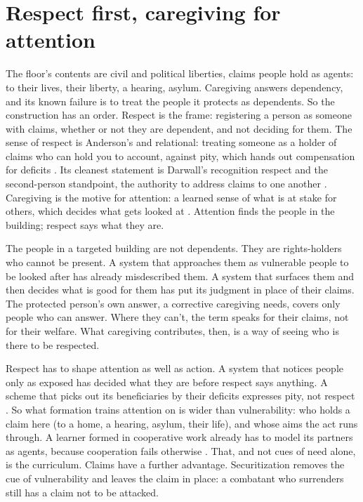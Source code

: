 \section{Respect first, caregiving for attention}
\label{sec:17.5}
The floor's contents are civil and political liberties, claims people hold as agents: to their lives, their liberty, a hearing, asylum. Caregiving answers dependency, and its known failure is to treat the people it protects as dependents. So the construction has an order. Respect is the frame: registering a person as someone with claims, whether or not they are dependent, and not deciding for them. The sense of respect is Anderson's and relational: treating someone as a holder of claims who can hold you to account, against pity, which hands out compensation for deficits \autocite{anderson1999equality}. Its cleanest statement is Darwall's recognition respect and the second-person standpoint, the authority to address claims to one another \autocite{darwall1977two,darwall2006second}. Caregiving is the motive for attention: a learned sense of what is at stake for others, which decides what gets looked at \autocite{railton2014affective}. Attention finds the people in the building; respect says what they are.

The people in a targeted building are not dependents. They are rights-holders who cannot be present. A system that approaches them as vulnerable people to be looked after has already misdescribed them. A system that surfaces them and then decides what is good for them has put its judgment in place of their claims. The protected person's own answer, a corrective caregiving needs, covers only people who can answer. Where they can't, the term speaks for their claims, not for their welfare. What caregiving contributes, then, is a way of seeing who is there to be respected.

Respect has to shape attention as well as action. A system that notices people only as exposed has decided what they are before respect says anything. A scheme that picks out its beneficiaries by their deficits expresses pity, not respect \autocite{anderson1999equality}. So what formation trains attention on is wider than vulnerability: who holds a claim here (to a home, a hearing, asylum, their life), and whose aims the act runs through. A learner formed in cooperative work already has to model its partners as agents, because cooperation fails otherwise \autocite{railton2014reliance}. That, and not cues of need alone, is the curriculum. Claims have a further advantage. Securitization removes the cue of vulnerability and leaves the claim in place: a combatant who surrenders still has a claim not to be attacked.

